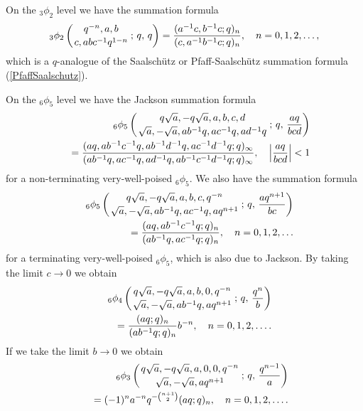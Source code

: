 \documentclass[envcountchap,graybox]{svmono}
\newcommand{\qhyp}[5]{\mbox{}_{#1}{\phi}_{#2}
\left(\genfrac{}{}{0pt}{}{#3}{#4}\,;\,q,\,#5\right)}
\begin{document}
On the ${}_3\phi_2$ level we have the summation formula
\begin{equation}
\label{qPfaffSaalschutz}
\index{q-Saalschutz summation formula@$q$-Saalsch\"{u}tz summation formula}
\index{Summation formula!q-Saalschutz@$q$-Saalsch\"{u}tz}
\index{q-Pfaff-Saalschutz summation formula@$q$-Pfaff-Saalsch\"{u}tz summation formula}
\index{Summation formula!q-Pfaff-Saalschutz@$q$-Pfaff-Saalsch\"{u}tz}
\qhyp{3}{2}{q^{-n},a,b}{c,abc^{-1}q^{1-n}}{q}=\frac{(a^{-1}c,b^{-1}c;q)_n}
{(c,a^{-1}b^{-1}c;q)_n},\quad n=0,1,2,\ldots,
\end{equation}
which is a $q$-analogue of the Saalsch\"utz or Pfaff-Saalsch\"utz summation formula
(\ref{PfaffSaalschutz}).

On the ${}_6\phi_5$ level we have the Jackson summation formula
\begin{eqnarray}
\label{qJackson1}\index{Jackson's summation formula}\index{Summation formula!Jackson}
\index{Summation formula!for a very-well-poised ${}_6\phi_5$}
& &\qhyp{6}{5}{q\sqrt{a},-q\sqrt{a},a,b,c,d}{\sqrt{a},-\sqrt{a},ab^{-1}q,ac^{-1}q,ad^{-1}q}{\frac{aq}{bcd}}\nonumber\\
& &{}=\frac{(aq,ab^{-1}c^{-1}q,ab^{-1}d^{-1}q,ac^{-1}d^{-1}q;q)_{\infty}}
{(ab^{-1}q,ac^{-1}q,ad^{-1}q,ab^{-1}c^{-1}d^{-1}q;q)_{\infty}},\quad\left|\frac{aq}{bcd}\right|<1
\end{eqnarray}
for a non-terminating very-well-poised ${}_6\phi_5$. We also have the summation formula
\begin{eqnarray}
\label{qJackson2}
& &\qhyp{6}{5}{q\sqrt{a},-q\sqrt{a},a,b,c,q^{-n}}{\sqrt{a},-\sqrt{a},ab^{-1}q,ac^{-1}q,aq^{n+1}}{\frac{aq^{n+1}}{bc}}\nonumber\\
& &{}=\frac{(aq,ab^{-1}c^{-1}q;q)_n}{(ab^{-1}q,ac^{-1}q;q)_n},\quad n=0,1,2,\ldots
\end{eqnarray}
for a terminating very-well-poised ${}_6\phi_5$, which is also due to Jackson.
By taking the limit $c\rightarrow 0$ we obtain
\begin{eqnarray}
\label{qJackson3}
& &\qhyp{6}{4}{q\sqrt{a},-q\sqrt{a},a,b,0,q^{-n}}{\sqrt{a},-\sqrt{a},ab^{-1}q,aq^{n+1}}{\frac{q^n}{b}}\nonumber\\
& &{}=\frac{(aq;q)_n}{(ab^{-1}q;q)_n}b^{-n},\quad n=0,1,2,\ldots.
\end{eqnarray}
If we take the limit $b\rightarrow 0$ we obtain
\begin{eqnarray}
\label{qJackson4}
& &\qhyp{6}{3}{q\sqrt{a},-q\sqrt{a},a,0,0,q^{-n}}{\sqrt{a},-\sqrt{a},aq^{n+1}}{\frac{q^{n-1}}{a}}\nonumber\\
& &{}=(-1)^na^{-n}q^{-\binom{n+1}{2}}(aq;q)_n,\quad n=0,1,2,\ldots.
\end{eqnarray}
\end{document}
